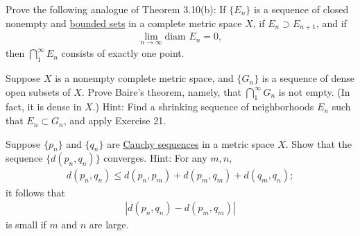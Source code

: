  \begin{exercise}[Rudin 3.21]
    Prove the following analogue of Theorem 3.10(b): If $\{E_n\}$ is a sequence of closed nonempty and \hyperref[pst-def:bounded-set]{bounded sets} in a complete metric space $X$, if $E_n \supset E_{n+1}$, and if
    \begin{align*}
      \lim_{n \to \infty} \text{diam } E_n = 0,
    \end{align*}
    then $\bigcap_{1}^{\infty} E_n$ consists of exactly one point.
  \end{exercise}
  \begin{solution}
    
  \end{solution}

  \begin{exercise}[Rudin 3.22]
    Suppose $X$ is a nonempty complete metric space, and $\{G_n\}$ is a sequence of dense open subsets of $X$. Prove Baire's theorem, namely, that $\bigcap_{1}^{\infty}G_n$ is not empty. (In fact, it is dense in $X$.) Hint: Find a shrinking sequence of neighborhoods $E_n$ such that $E_n \subset G_n$, and apply Exercise 21.
  \end{exercise}
  \begin{solution}
    
  \end{solution}

  \begin{exercise}[Rudin 3.23]
    Suppose $\{p_n\}$ and $\{q_n\}$ are \hyperref[def:cauchy-sequence]{Cauchy sequences} in a metric space $X$. Show that the sequence $\{d(p_n, q_n)\}$ converges. Hint: For any $m, n$,
    \begin{align*}
      d(p_n, q_n) \leq d(p_n, p_m) + d(p_m, q_m) + d(q_m, q_n);
    \end{align*}
    it follows that
    \begin{align*}
      |d(p_n, q_n) - d(p_m, q_m)|
    \end{align*}
    is small if $m$ and $n$ are large.
  \end{exercise}
  \begin{solution}
    
  \end{solution}

